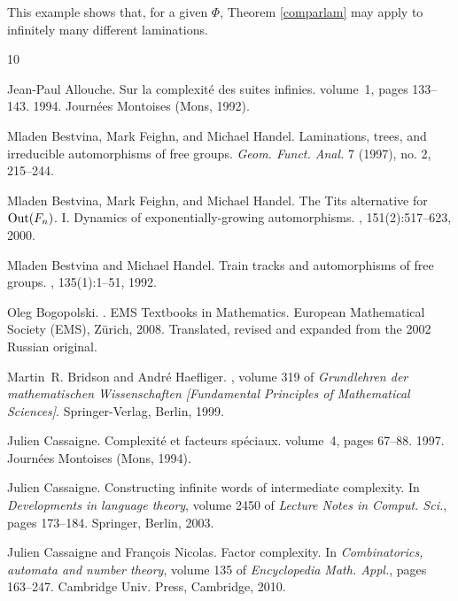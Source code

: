 \documentclass[11pt]{amsart}
\theoremstyle{remark}
\begin{document}
 This example shows that, for a given $\Phi$, Theorem \ref{comparlam} may apply to infinitely many different laminations.

% 

\begin{thebibliography}{10}

Jean-Paul Allouche.
\newblock Sur la complexit\'{e} des suites infinies.
\newblock volume~1, pages 133--143. 1994.
\newblock Journ\'{e}es Montoises (Mons, 1992).

Mladen Bestvina, Mark Feighn, and Michael Handel.
\newblock  Laminations, trees, and irreducible automorphisms of free groups.  {\em Geom. Funct. Anal.} 7 (1997), no. 2, 215--244. 

Mladen Bestvina, Mark Feighn, and Michael Handel.
\newblock The {T}its alternative for {${\rm Out}(F_n)$}. {I}. {D}ynamics of
  exponentially-growing automorphisms.
, 151(2):517--623, 2000.

Mladen Bestvina and Michael Handel.
\newblock Train tracks and automorphisms of free groups.
, 135(1):1--51, 1992.

Oleg Bogopolski.
.
\newblock EMS Textbooks in Mathematics. European Mathematical Society (EMS),
  Z\"{u}rich, 2008.
\newblock Translated, revised and expanded from the 2002 Russian original.

Martin~R. Bridson and Andr\'{e} Haefliger.
, volume 319 of {\em
  Grundlehren der mathematischen Wissenschaften [Fundamental Principles of
  Mathematical Sciences]}.
\newblock Springer-Verlag, Berlin, 1999.

Julien Cassaigne.
\newblock Complexit\'{e} et facteurs sp\'{e}ciaux.
\newblock volume~4, pages 67--88. 1997.
\newblock Journ\'{e}es Montoises (Mons, 1994).

Julien Cassaigne.
\newblock Constructing infinite words of intermediate complexity.
\newblock In {\em Developments in language theory}, volume 2450 of {\em Lecture
  Notes in Comput. Sci.}, pages 173--184. Springer, Berlin, 2003.

Julien Cassaigne and Fran\c{c}ois Nicolas.
\newblock Factor complexity.
\newblock In {\em Combinatorics, automata and number theory}, volume 135 of
  {\em Encyclopedia Math. Appl.}, pages 163--247. Cambridge Univ. Press,
  Cambridge, 2010.


\end{thebibliography}
\end{document}
